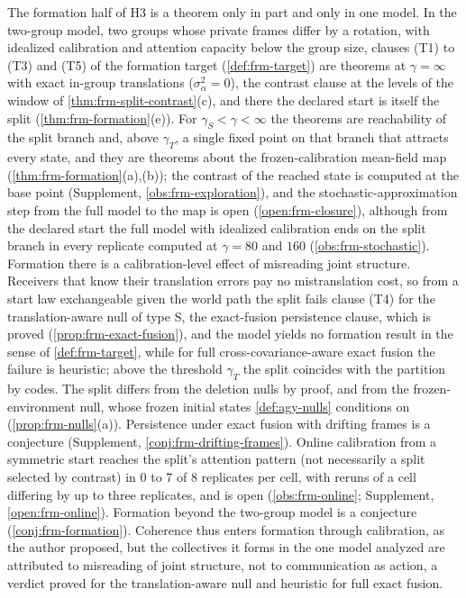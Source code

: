 The formation half of H3 is a theorem only in part and only in one model. In the two-group model, two groups whose private frames differ by a rotation, with idealized calibration and attention capacity below the group size, clauses (T1) to (T3) and (T5) of the formation target (\cref{def:frm-target}) are theorems at $\gamma=\infty$ with exact in-group translations ($\sigma_\alpha^2=0$), the contrast clause at the levels of the window of \cref{thm:frm-split-contrast}(c), and there the declared start is itself the split (\cref{thm:frm-formation}(e)). For $\gamma_S<\gamma<\infty$ the theorems are reachability of the split branch and, above $\gamma_T$, a single fixed point on that branch that attracts every state, and they are theorems about the frozen-calibration mean-field map (\cref{thm:frm-formation}(a),(b)); the contrast of the reached state is computed at the base point (Supplement, \cref{obs:frm-exploration}), and the stochastic-approximation step from the full model to the map is open (\cref{open:frm-closure}), although from the declared start the full model with idealized calibration ends on the split branch in every replicate computed at $\gamma=80$ and $160$ (\cref{obs:frm-stochastic}). Formation there is a calibration-level effect of misreading joint structure. Receivers that know their translation errors pay no mistranslation cost, so from a start law exchangeable given the world path the split fails clause (T4) for the translation-aware null of type S, the exact-fusion persistence clause, which is proved (\cref{prop:frm-exact-fusion}), and the model yields no formation result in the sense of \cref{def:frm-target}, while for full cross-covariance-aware exact fusion the failure is heuristic; above the threshold $\gamma_T$ the split coincides with the partition by codes. The split differs from the deletion nulls by proof, and from the frozen-environment null, whose frozen initial states \cref{def:agy-nulls} conditions on (\cref{prop:frm-nulls}(a)). Persistence under exact fusion with drifting frames is a conjecture (Supplement, \cref{conj:frm-drifting-frames}). Online calibration from a symmetric start reaches the split's attention pattern (not necessarily a split selected by contrast) in 0 to 7 of 8 replicates per cell, with reruns of a cell differing by up to three replicates, and is open (\cref{obs:frm-online}; Supplement, \cref{open:frm-online}). Formation beyond the two-group model is a conjecture (\cref{conj:frm-formation}). Coherence thus enters formation through calibration, as the author proposed, but the collectives it forms in the one model analyzed are attributed to misreading of joint structure, not to communication as action, a verdict proved for the translation-aware null and heuristic for full exact fusion.

